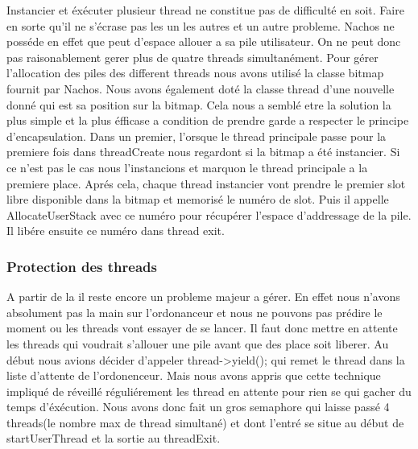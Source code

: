 \documentclass[10pt]{article}
\begin{document}
Instancier et éxécuter plusieur thread ne constitue pas de difficulté en soit.
Faire en sorte qu'il ne s'écrase pas les un les autres et un autre probleme.
Nachos ne posséde en effet que peut d'espace allouer a sa pile utilisateur.
On ne peut donc pas raisonablement gerer plus de quatre threads simultanément.
\newline
Pour gérer l'allocation des piles des different threads nous avons utilisé la classe
bitmap fournit par Nachos. Nous avons également doté la classe thread d'une nouvelle donné
qui est sa position sur la bitmap. Cela nous a semblé etre la solution la plus simple et
la plus éfficase a condition de prendre garde a respecter le principe d'encapsulation.
Dans un premier, l'orsque le thread principale passe pour la premiere fois dans threadCreate
nous regardont si la bitmap a été instancier. Si ce n'est pas le cas nous l'instancions
et marquon le thread principale a la premiere place.
\newline
Aprés cela, chaque thread instancier vont prendre le premier slot libre disponible dans
la bitmap et memorisé le numéro de slot. Puis il appelle AllocateUserStack avec ce
numéro pour récupérer l'espace d'addressage de la pile.
Il libére ensuite ce numéro dans thread exit.

\subsubsection{Protection des threads}

A partir de la il reste encore un probleme majeur a gérer. En effet nous n'avons absolument
pas la main sur l'ordonanceur et nous ne pouvons pas prédire le moment ou les threads
vont essayer de se lancer. Il faut donc mettre en attente les threads qui voudrait
s'allouer une pile avant que des place soit liberer.
\newline
Au début nous avions décider
d'appeler thread->yield(); qui remet le thread dans la liste d'attente de l'ordonenceur.
Mais nous avons appris que cette technique impliqué de réveillé réguliérement les
thread en attente pour rien se qui gacher du temps d'éxécution.
\newline
Nous avons donc fait un gros semaphore qui laisse passé 4 threads(le nombre max de thread
simultané) et dont l'entré se situe au début de startUserThread et la sortie au threadExit.
\end{document}
